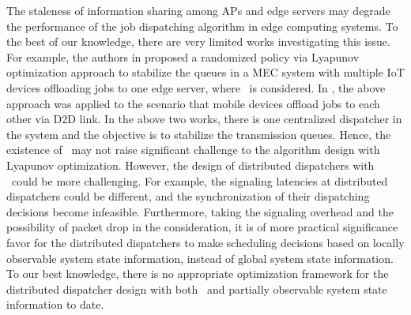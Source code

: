{
    The staleness of information sharing among APs and edge servers may degrade the performance of the job dispatching algorithm in edge computing systems.
    To the best of our knowledge, there are very limited works investigating this issue.
    For example, the authors in \cite{JSAC17-LyuX} proposed a randomized policy via Lyapunov optimization approach to stabilize the queues in a MEC system with multiple IoT devices offloading jobs to one edge server, where \brlatency~is considered. 
    In \cite{TWC18-LyuX}, the above approach was applied to the scenario that mobile devices offload jobs to each other via D2D link.
    In the above two works, there is one centralized dispatcher in the system and the objective is to stabilize the transmission queues.
    Hence, the existence of \brlatency~may not raise significant challenge to the algorithm design with Lyapunov optimization.
    However, the design of distributed dispatchers with \brlatency~could be more challenging.
    For example, the signaling latencies at distributed dispatchers could be different, and the synchronization of their dispatching decisions become infeasible.
    Furthermore, taking the signaling overhead and the possibility of packet drop in the consideration, it is of more practical significance favor for the distributed dispatchers to make scheduling decisions based on locally observable system state information, instead of global system state information.
    To our best knowledge, there is no appropriate optimization framework for the distributed dispatcher design with both \brlatency~and partially observable system state information to date.
}

